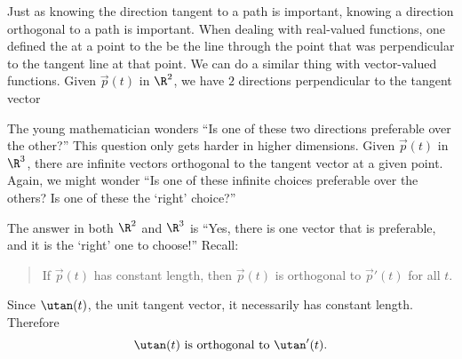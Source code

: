 \documentclass{ximera}
\begin{document}
Just as knowing the direction tangent to a path is important, knowing
a direction orthogonal to a path is important. When dealing with
real-valued functions, one defined the  at a point to
the be the line through the point that was perpendicular to the
tangent line at that point. We can do a similar thing with
vector-valued functions. Given $\vec{p}(t)$ in $\R^2$, we have $2$
directions perpendicular to the tangent vector
\begin{image}
\end{image}
The young mathematician wonders ``Is one of these two directions
preferable over the other?''  This question only gets harder in higher
dimensions.  Given $\vec{p}(t)$ in $\R^3$, there are infinite vectors
orthogonal to the tangent vector at a given point. Again, we might
wonder ``Is one of these infinite choices preferable over the others?
Is one of these the `right' choice?''

The answer in both $\R^2$ and $\R^3$ is ``Yes, there is one vector
that is preferable, and it is the `right' one to choose!'' Recall:
\begin{quote}
If $\vec{p}(t)$ has constant length, then $\vec{p}(t)$ is orthogonal
to $\vec{p}'(t)$ for all $t$.
\end{quote}
Since $\utan(t)$, the unit tangent vector, it necessarily has
constant length. Therefore
\[
\utan(t)\text{ is orthogonal to }\utan'(t).
\]
\end{document}
